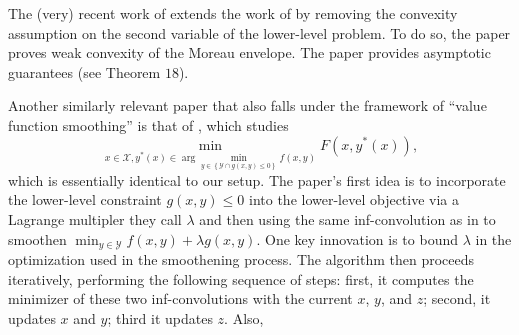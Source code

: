 The (very) recent work of \cite{gao2024moreau} extends the work of \cite{ye2023difference} by removing the convexity assumption on the second variable of the lower-level problem. To do so, the paper proves weak convexity of the Moreau envelope.  The paper provides asymptotic guarantees (see Theorem $18$).

Another similarly relevant paper that also falls under the framework of ``value function smoothing'' is that of 
  \cite{yao2024constrained}, which studies \[\min_{x\in \mathcal{X}, y^\ast(x)\in \arg\min_{y\in \left\{\mathcal{Y}\cap g(x, y)\leq 0\right\}} f(x,y)} F(x, y^\ast(x)),\] which is essentially identical to our setup. The paper's first idea is to incorporate the lower-level constraint $g(x,y)\leq0$ into the lower-level objective via a Lagrange multipler they call $\lambda$  and then using the same inf-convolution as in \cite{liu2021value} to smoothen $\min_{y\in \mathcal{Y}} f(x,y) + \lambda g(x,y)$. One key innovation is to bound $\lambda$ in the optimization used in the smoothening process.  The algorithm then proceeds iteratively, performing the following sequence of steps: first, it computes the minimizer of these two inf-convolutions with the current $x$, $y$, and $z$; second, it updates $x$ and $y$; third it updates $z$.  Also, 

